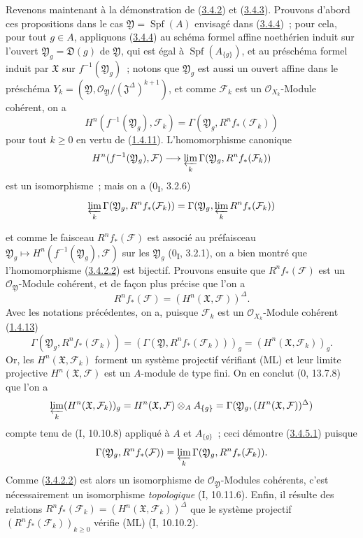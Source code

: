 \begin{env}[3.4.5]
\label{III.3.4.5-fr}
Revenons maintenant à la démonstration de (\hyperref[III.3.4.2-fr]{3.4.2})
et (\hyperref[III.3.4.3-fr]{3.4.3}). Prouvons d'abord ces propositions dans
le cas $\mathfrak Y=\operatorname{Spf}(A)$ envisagé dans
(\hyperref[III.3.4.4-fr]{3.4.4})~; pour cela, pour tout $g\in A$, appliquons
(\hyperref[III.3.4.4-fr]{3.4.4}) au schéma formel affine noethérien induit
sur l'ouvert $\mathfrak Y_g=\mathfrak D(g)$ de $\mathfrak Y$, qui est égal à
$\operatorname{Spf}(A_{\{g\}})$, et au préschéma formel induit par
$\mathfrak X$ sur $f^{-1}(\mathfrak Y_g)$~; notons que $\mathfrak Y_g$ est
aussi un ouvert affine dans le préschéma
$Y_k=(\mathfrak Y,\mathcal O_{\mathfrak Y}/(\mathfrak J^\Delta)^{k+1})$,
et comme $\mathcal F_k$ est un $\mathcal O_{X_k}$-Module cohérent, on a
\[
H^n(f^{-1}(\mathfrak Y_g),\mathcal F_k)
=\Gamma(\mathfrak Y_g,R^nf_*(\mathcal F_k))
\]
pour tout $k\geq0$ en vertu de
(\hyperref[III.1.4.11-fr]{1.4.11}). L'homomorphisme canonique
\[
H^n(f^{-1}(\mathfrak Y_g),\mathcal F)
\longrightarrow\varprojlim_k\Gamma(\mathfrak Y_g,R^nf_*(\mathcal F_k))
\]
est un isomorphisme~; mais on a (0\textsubscript{I}, 3.2.6)
\[
\varprojlim_k\Gamma(\mathfrak Y_g,R^nf_*(\mathcal F_k))
=\Gamma(\mathfrak Y_g,\varprojlim_kR^nf_*(\mathcal F_k))
\]

et comme le faisceau $R^nf_*(\mathcal F)$ est associé au préfaisceau
$\mathfrak Y_g\mapsto H^n(f^{-1}(\mathfrak Y_g),\mathcal F)$ sur les
$\mathfrak Y_g$ (0\textsubscript{I}, 3.2.1), on a bien montré que
l'homomorphisme (\hyperref[III.3.4.2.2-fr]{3.4.2.2}) est bijectif. Prouvons
ensuite que $R^nf_*(\mathcal F)$ est un $\mathcal O_{\mathfrak Y}$-Module
cohérent, et de façon plus précise que l'on a
\[
R^nf_*(\mathcal F)=(H^n(\mathfrak X,\mathcal F))^\Delta.
\tag{3.4.5.1}\label{III.3.4.5.1-fr}
\]
Avec les notations précédentes, on a, puisque $\mathcal F_k$ est un
$\mathcal O_{X_k}$-Module cohérent (\hyperref[III.1.4.13-fr]{1.4.13})
\[
\Gamma(\mathfrak Y_g,R^nf_*(\mathcal F_k))
=(\Gamma(\mathfrak Y,R^nf_*(\mathcal F_k)))_g
=(H^n(\mathfrak X,\mathcal F_k))_g.
\]
Or, les $H^n(\mathfrak X,\mathcal F_k)$ forment un système projectif
vérifiant (ML) et leur limite projective $H^n(\mathfrak X,\mathcal F)$ est
un $A$-module de type fini. On en conclut (0, 13.7.8) que l'on a
\[
\varprojlim_k(H^n(\mathfrak X,\mathcal F_k))_g
=H^n(\mathfrak X,\mathcal F)\otimes_AA_{\{g\}}
=\Gamma(\mathfrak Y_g,(H^n(\mathfrak X,\mathcal F))^\Delta)
\]
compte tenu de (I, 10.10.8) appliqué à $A$ et $A_{\{g\}}$~; ceci démontre
(\hyperref[III.3.4.5.1-fr]{3.4.5.1}) puisque
\[
\Gamma(\mathfrak Y_g,R^nf_*(\mathcal F))
=\varprojlim_k\Gamma(\mathfrak Y_g,R^nf_*(\mathcal F_k)).
\]
Comme (\hyperref[III.3.4.2.2-fr]{3.4.2.2}) est alors un isomorphisme de
$\mathcal O_{\mathfrak Y}$-Modules cohérents, c'est nécessairement un
isomorphisme \emph{topologique} (I, 10.11.6). Enfin, il résulte des relations
$R^nf_*(\mathcal F_k)=(H^n(\mathfrak X,\mathcal F_k))^\Delta$ que le système
projectif $(R^nf_*(\mathcal F_k))_{k\geq0}$ vérifie (ML) (I, 10.10.2).


\end{env}
